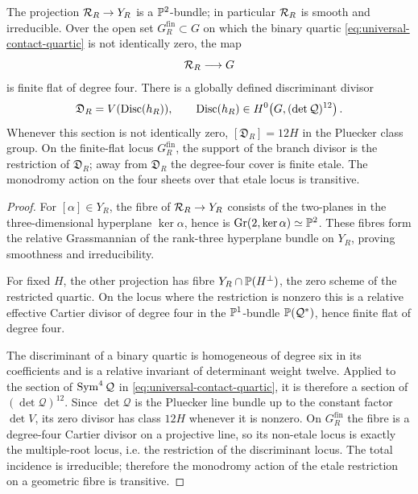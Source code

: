 \begin{proposition}
\label{prop:contact-cover}
The projection $\mathcal R_R\to Y_R$ is a $\mathbb P^2$-bundle; in particular
$\mathcal R_R$ is smooth and irreducible.  Over the open set
$G^\mathrm{fin}_R\subset G$ on which the binary quartic
\eqref{eq:universal-contact-quartic} is not identically zero, the
map
\[
 \mathcal R_R\longrightarrow G
\]
is finite flat of degree four.  There is a globally defined discriminant divisor
\[
 \mathfrak D_R=
 V(\operatorname{Disc}(h_R)),\qquad
 \operatorname{Disc}(h_R)\in
 H^0\!\left(G,(\det\mathcal Q)^{12}\right).
\]
Whenever this section is not identically zero,
$[\mathfrak D_R]=12H$ in the Pluecker class group.  On the
finite-flat locus $G_R^{\mathrm{fin}}$, the support of the branch
divisor is the restriction of $\mathfrak D_R$; away from
$\mathfrak D_R$ the degree-four cover is finite etale.  The monodromy
action on the four sheets over that etale locus is transitive.
\end{proposition}
\begin{proof}
For $[\alpha]\in Y_R$, the fibre of
$\mathcal R_R\to Y_R$ consists of the two-planes in the three-dimensional
hyperplane $\ker\alpha$, hence is
$\operatorname{Gr}(2,\ker\alpha)\simeq\mathbb P^2$.  These fibres form the relative
Grassmannian of the rank-three hyperplane bundle on $Y_R$, proving
smoothness and irreducibility.

For fixed $H$, the other projection has fibre
$Y_R\cap\mathbb P(H^\perp)$, the zero scheme of the restricted quartic.
On the locus where the restriction is nonzero this is a relative
effective Cartier divisor of degree four in the $\mathbb P^1$-bundle
$\mathbb P(\mathcal Q^*)$, hence finite flat of degree four.

The discriminant of a binary quartic is homogeneous of degree six in
its coefficients and is a relative invariant of determinant weight
twelve.  Applied to the section of $\operatorname{Sym}^4\mathcal Q$ in
\eqref{eq:universal-contact-quartic}, it is therefore a section of
$(\det\mathcal Q)^{12}$.  Since
$\det\mathcal Q$ is the Pluecker line bundle up to the constant
factor $\det V$, its zero divisor has class $12H$ whenever it is
nonzero.  On $G_R^{\mathrm{fin}}$ the fibre is a degree-four Cartier
divisor on a projective line, so its non-etale locus is exactly the
multiple-root locus, i.e. the restriction of the discriminant locus.
The total incidence is irreducible; therefore the monodromy action of
the etale restriction on a geometric fibre is transitive.
\end{proof}

